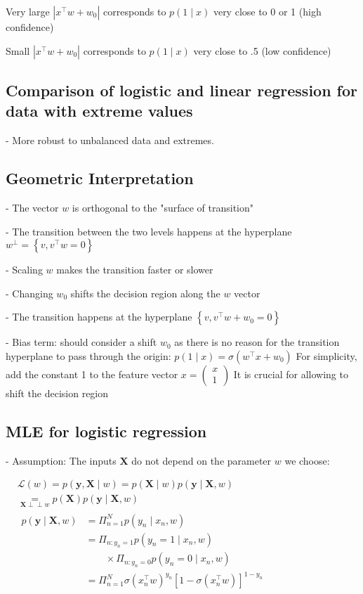 Very large $\left|x^{\top} w+w_{0}\right|$ corresponds to $p(1 \mid x)$ very close to 0 or 1 (high confidence)

Small $\left|x^{\top} w+w_{0}\right|$ corresponds to $p(1 \mid x)$ very close to .5 (low confidence)


\subsection*{Comparison of logistic and linear regression for data with extreme values}

- More robust to unbalanced data and extremes.

\subsection*{Geometric Interpretation}

- The vector $w$ is orthogonal to the "surface of transition"

- The transition between the two levels happens at the hyperplane $w^{\perp}=\left\{v, v^{\top} w=0\right\}$

- Scaling $w$ makes the transition faster or slower


- Changing $w_{0}$ shifts the decision region along the $w$ vector

- The transition happens at the hyperplane $\left\{v, v^{\top} w+w_{0}=0\right\}$

- Bias term: should consider a shift $w_{0}$ as there is no reason for the transition hyperplane to pass through the origin:
$
p(1 \mid x)=\sigma\left(w^{\top} x+w_{0}\right)
$
For simplicity, add the constant 1 to the feature vector
$
x=\left(\begin{array}{c}
x \\
1
\end{array}\right)
$
It is crucial for allowing to shift the decision region

\subsection*{MLE for logistic regression}
- Assumption: The inputs $\mathbf{X}$ do not depend on the parameter $w$ we choose:

$
\begin{aligned}
& \mathscr{L}(w)=p(\mathbf{y}, \mathbf{X} \mid w)=p(\mathbf{X} \mid w) p(\mathbf{y} \mid \mathbf{X}, w) \\ & \underset{\mathbf{X} \perp \perp w}{=} p(\mathbf{X}) p(\mathbf{y} \mid \mathbf{X}, w) \\
& \begin{aligned}
p(\mathbf{y} \mid \mathbf{X}, w) & =\Pi_{n=1}^{N} p\left(y_{n} \mid x_{n}, w\right) \\
& =\Pi_{n: y_{n}=1} p\left(y_{n}=1 \mid x_{n}, w\right) \\ & \qquad \times \Pi_{n: y_{n}=0} p\left(y_{n}=0 \mid x_{n}, w\right) \\
& =\Pi_{n=1}^{N} \sigma\left(x_{n}^{\top} w\right)^{y_{n}}\left[1-\sigma\left(x_{n}^{\top} w\right)\right]^{1-y_{n}}
\end{aligned}
\end{aligned}
$

